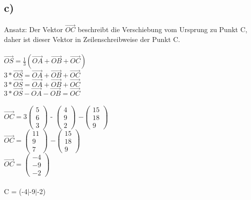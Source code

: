 \documentclass{article}
\begin{document}
	\subsection*{c)}
	Ansatz: Der Vektor $\vec{OC}$ beschreibt die Verschiebung vom Ursprung zu Punkt C, daher ist dieser Vektor in Zeilenschreibweise der Punkt C. \\
	\\
	$\vec{OS} = \frac{1}{3}(\vec{OA}+\vec{OB}+\vec{OC})$ \\
	$3*\vec{OS} = \vec{OA}+\vec{OB}+\vec{OC}$ \\
	$3*\vec{OS} = \vec{OA}+\vec{OB}+\vec{OC}$ \\
	$3*\vec{OS} - \vec{OA} - \vec{OB} = \vec{OC}$ \\
	\\
	$
	\vec{OC}= 3
	\left(\begin{array}{c} 
	5 \\ 6 \\ 3 \end{array}\right)
	$ - 
	$\left(\begin{array}{c} 
		4 \\ 9 \\ 2 
	\end{array}\right)
	$
	$ - 
	\left(\begin{array}{c} 
	15 \\ 18 \\ 9 \end{array}\right)
	$ \\
	$
	\vec{OC}=
	\left(\begin{array}{c} 
	11 \\ 9 \\ 7 \end{array}\right)
	$
	$ - 
	\left(\begin{array}{c} 
	15 \\ 18 \\ 9 \end{array}\right)
	$ \\
	$
	\vec{OC}=
	\left(\begin{array}{c} 
	-4 \\ -9 \\ -2 \end{array}\right)
	$ \\ \\
	C = (-4$|$-9$|$-2)
\end{document}
